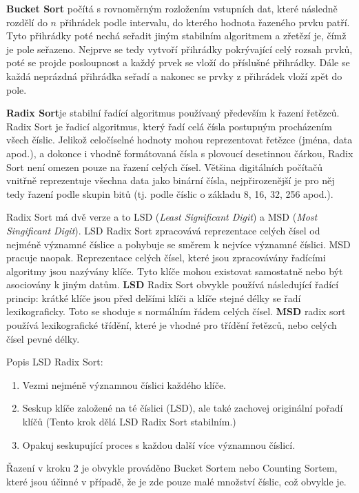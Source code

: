 \textbf{Bucket Sort} počítá s rovnoměrným rozložením vstupních dat, které následně rozdělí do $n$ přihrádek podle intervalu, do kterého hodnota řazeného prvku patří. Tyto přihrádky poté nechá seřadit jiným stabilním algoritmem a zřetězí je, čímž je pole seřazeno. Nejprve se tedy vytvoří přihrádky pokrývající celý rozsah prvků, poté se projde posloupnost a každý prvek se vloží do příslušné přihrádky. Dále se každá neprázdná přihrádka seřadí a nakonec se prvky z přihrádek vloží zpět do pole.

\textbf{Radix Sort}je stabilní řadící algoritmus používaný především k řazení řetězců. Radix Sort je řadicí algoritmus, který řadí celá čísla postupným procházením všech číslic. Jelikož celočíselné hodnoty mohou reprezentovat řetězce (jména, data apod.), a dokonce i vhodně formátovaná čísla s plovoucí desetinnou čárkou, Radix Sort není omezen pouze na řazení celých čísel. Většina digitálních počítačů vnitřně reprezentuje všechna data jako binární  čísla, nejpřirozenější je pro něj tedy řazení podle skupin bitů (tj. podle číslic o základu 8, 16, 32, 256 apod.).

Radix Sort má dvě verze a to LSD (\textit{Least Significant Digit}) a MSD (\textit{Most Singificant Digit}). LSD Radix Sort zpracovává reprezentace celých čísel od nejméně významné číslice a pohybuje se směrem k nejvíce významné číslici. MSD pracuje naopak. Reprezentace celých  čísel, které jsou zpracovávány  řadícími algoritmy jsou nazývány klíče. Tyto klíče mohou existovat samostatně nebo být asociovány k jiným datům. \textbf{LSD} Radix Sort obvykle používá následující řadící princip: krátké klíče jsou před delšími klíči a klíče stejné délky se řadí lexikograficky. Toto se shoduje s normálním řádem celých čísel. \textbf{MSD} radix sort používá lexikografické třídění, které je vhodné pro třídění  řetězců, nebo celých čísel pevné délky.

Popis LSD Radix Sort:
\begin{enumerate}
\item Vezmi nejméně významnou číslici každého klíče.
\item Seskup klíče založené na té číslici (LSD), ale také zachovej originální pořadí klíčů (Tento krok dělá LSD Radix Sort stabilním.)
\item Opakuj seskupující proces s každou další více významnou číslicí.
\end{enumerate}
Řazení v kroku 2 je obvykle prováděno Bucket Sortem nebo Counting Sortem, které jsou účinné v případě, že je zde pouze malé množství číslic, což obvykle je.


